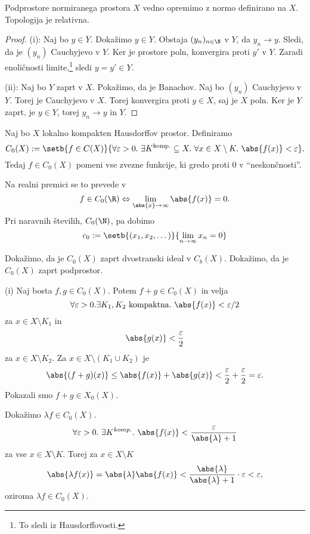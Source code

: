 \begin{opomba}
    Podprostore normiranega prostora $X$ vedno opremimo z normo 
    definirano na $X$. Topologija je relativna.
\end{opomba}

\begin{proof}
    (i): Naj bo $y \in \overline{Y}$. Dokažimo $y \in Y$. 
    Obstaja $(y_n)_{n \in \N}$ v $Y$, da $y_n \to y$. Sledi, 
    da je $(y_n)$ Cauchyjevo v $Y$. Ker je prostore poln,
    konvergira proti $y'$ v $Y$. Zaradi enoličnosti limite,\footnote{To sledi iz Hausdorffovosti.}
    sledi $y = y' \in Y$.

    (ii): Naj bo $Y$ zaprt v $X$. Pokažimo, da je Banachov.
    Naj bo $(y_n)$ Cauchyjevo v $Y$. Torej je Cauchyjevo 
    v $X$. Torej konvergira proti $y \in X$, saj je $X$ 
    poln. Ker je $Y$ zaprt, je $y \in Y$, torej 
    $y_n \to y$ in $Y$.
\end{proof}


    Naj bo $X$ lokalno kompakten Hausdorffov prostor. Definiramo
    \[
        C_0(X) := \setb{f \in C(X)}{\forall \varepsilon > 0.~
        \exists K^{\text{komp.}} \subseteq X.~\forall x 
        \in X\setminus K.~\abs{f(x)} < \varepsilon}.
    \]
    Tedaj $f \in C_0(X)$ pomeni vse zvezne funkcije, ki 
    gredo proti $0$ v ``neskončnosti''.

\begin{primer}
    Na realni premici se to prevede v
    \[
        f \in C_0(\R) \Leftrightarrow \lim_{\abs{x} \to \infty} \abs{f(x)}= 0.
    \]
    Pri naravnih številih, $C_0(\N)$, pa dobimo
    \[
        c_0 := \setb{(x_1,x_2, \dots)}{\lim_{n \to \infty} x_n = 0}
    \]
\end{primer}

Dokažimo, da je $C_0(X)$ zaprt dvostranski ideal v $C_b(X)$.
Dokažimo, da je $C_0(X)$ zaprt podprostor. 

(i) Naj bosta $f,g \in C_0(X)$. Potem $f + g \in C_0(X)$ in velja
\[
    \forall \varepsilon > 0. \exists K_1, K_2~\text{kompaktna}.~
    \abs{f(x)} < \varepsilon/2
\]
za $x \in X\setminus K_1$ in 
\[
    \abs{g(x)} < \frac{\varepsilon}{2}
\]
za $x \in X \setminus K_2$. Za $x \in X \setminus (K_1 \cup K_2)$ je
\[
    \abs{(f+g)(x)} \le \abs{f(x)} + \abs{g(x)} < \frac{\varepsilon}{2} + \frac{\varepsilon}{2} = \varepsilon.
\]
Pokazali smo $f + g \in X_0(X)$.

Dokažimo $\lambda f \in C_0(X)$.
\[
    \forall \varepsilon > 0.~\exists K^{komp.}.~
    \abs{f(x)} < \frac{\varepsilon}{\abs{\lambda} + 1}
\]
za vse $x \in X \setminus K$. Torej za $x \in X\setminus K$
\[
    \abs{\lambda f(x)} = \abs{\lambda}
    \abs{f(x)} < \frac{\abs{\lambda}}{\abs{\lambda} + 1} \cdot \varepsilon
    < \varepsilon,
\]
oziroma $\lambda f \in C_0(X)$.

